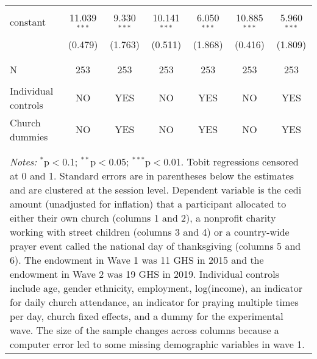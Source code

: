 \begin{table}[!htbp]
\begin{tabular}{@{\extracolsep{5pt}}lcccccc}
  & & & & & & \\ 
 constant & 11.039$^{***}$ & 9.330$^{***}$ & 10.141$^{***}$ & 6.050$^{***}$ & 10.885$^{***}$ & 5.960$^{***}$ \\ 
  & (0.479) & (1.763) & (0.511) & (1.868) & (0.416) & (1.809) \\ 
  & & & & & & \\ 
\cline{2-7} \\[-2.0ex]
N & 253 & 253 & 253 & 253 & 253 & 253 \\  \hline \\[-1.8ex] 
Individual controls & NO & YES & NO & YES & NO & YES \\ 
Church dummies & NO & YES & NO & YES & NO & YES \\ 
\\[-2.0ex]
\hline 
\hline \\[-1.8ex] 
\multicolumn{7}{l}{ \parbox[t]{0.95\linewidth}{\small{ \textit{Notes:} $^{*}$p$<$0.1; $^{**}$p$<$0.05; $^{***}$p$<$0.01}.  Tobit regressions censored at 0 and 1. Standard errors are in parentheses below the estimates and are clustered at the session level. Dependent variable is the cedi amount (unadjusted for inflation) that a participant allocated to either their own church (columns 1 and 2), a nonprofit charity working with street children (columns 3 and 4) or a country-wide prayer event called the national day of thanksgiving (columns 5 and 6). The endowment in Wave 1 was 11 GHS in 2015 and the endowment in Wave 2 was 19 GHS in 2019. Individual controls include age, gender ethnicity, employment, log(income), an indicator for daily church attendance, an indicator for praying multiple times per day, church fixed effects, and a dummy for the experimental wave. The size of the sample changes across columns because a computer error led to some missing demographic variables in wave 1. }}\\
\end{tabular} 
\end{table} 
